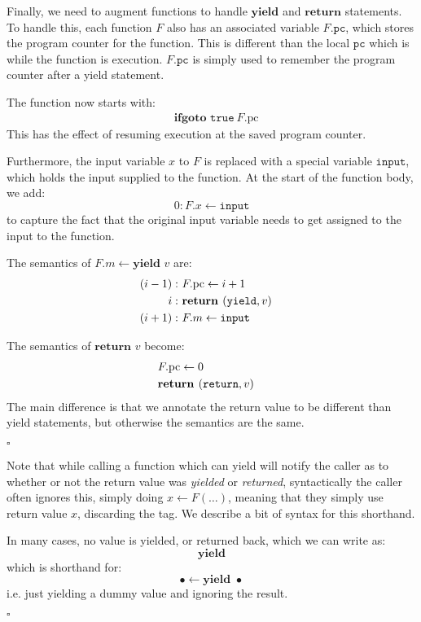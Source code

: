 \begin{definition}
Finally, we need to augment functions to handle $\textbf{yield}$ and $\textbf{return}$
statements.
To handle this, each function $F$ also has an associated variable
$F.\texttt{pc}$, which stores the program counter for the function.
This is different than the local $\texttt{pc}$ which is while the function is
execution.
$F.\texttt{pc}$ is simply used to remember the program counter after a yield
statement.

The function now starts with:
$$
\begin{aligned}
&\textbf{ifgoto } \texttt{true}\ F.\text{pc} 
\end{aligned}
$$
This has the effect of resuming execution at the saved program counter.

Furthermore, the input variable $x$ to $F$ is replaced with a special
variable $\texttt{input}$, which holds the input supplied to the function.
At the start of the function body, we add:
$$
0: F.x \gets \texttt{input}
$$
to capture the fact that the original input variable needs to get assigned
to the input to the function.

The semantics of $F.m \gets \textbf{yield } v$ are:
$$
\begin{aligned}
(i-1):&\ F.\text{pc} \gets i + 1\cr
i:&\ \textbf{return } (\texttt{yield}, v)\cr
(i + 1):&\ F.m \gets \texttt{input}
\end{aligned}
$$

The semantics of $\textbf{return } v$ become:
$$
\begin{aligned}
&F.\text{pc} \gets 0\cr
&\textbf{return } (\texttt{return}, v)
\end{aligned}
$$
The main difference is that we annotate the return value to be different than
yield statements, but otherwise the semantics are the same.

$\square$
\end{definition}

Note that while calling a function which can yield will notify the
caller as to whether or not the return value was \emph{yielded}
or \emph{returned}, syntactically the caller often ignores this,
simply doing $x \gets F(\ldots)$, meaning that they simply use
return value $x$, discarding the tag.
We describe a bit of syntax for this shorthand.

\begin{syntax}
In many cases, no value is yielded, or returned back, which we can write as:
$$
\textbf{yield}
$$
which is shorthand for:
$$
\bullet \gets \textbf{yield } \bullet
$$
i.e. just yielding a dummy value and ignoring the result.

$\square$
\end{syntax}

